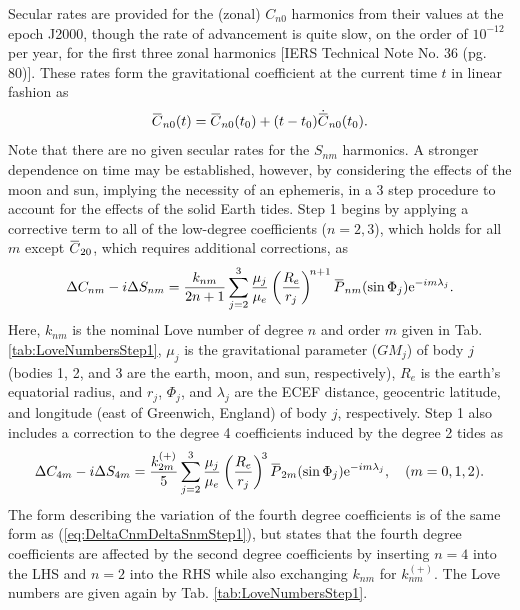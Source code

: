 \documentclass[11pt,dvipsnames]{thesis}
\newcommand{\overbar}[1]{\mkern 1.5mu\overline{\mkern-1.5mu#1\mkern-1.5mu}\mkern 1.5mu}
\begin{document}
Secular rates are provided for the (zonal) $C_{n0}$ harmonics from their values at the epoch J2000, though the rate of advancement is quite slow, on the order of $10^{-12}$ per year, for the first three zonal harmonics [IERS Technical Note No. 36 (pg. 80)]. These rates form the gravitational coefficient at the current time $t$ in linear fashion as
\begin{equation}
\overbar{C}_{n0}(t) = \overbar{C}_{n0}(t_0) + (t - t_0) \dot{\overbar{C}}_{n0}(t_0).
\end{equation}
Note that there are no given secular rates for the $S_{nm}$ harmonics. A stronger dependence on time may be established, however, by considering the effects of the moon and sun, implying the necessity of an ephemeris, in a 3 step procedure to account for the effects of the solid Earth tides. Step 1 begins by applying a corrective term to all of the low-degree coefficients ($n=2,3$), which holds for all $m$ except $\overbar{C}_{20}$, which requires additional corrections, as
\begin{equation}
\Delta C_{nm} - i \Delta S_{nm} = \frac{k_{nm}}{2n + 1} \sum_{j = 2}^3 \frac{\mu_j}{\mu_e} \left(\frac{R_e}{r_j}\right)^{\!n+1} \overbar{P}_{nm}(\sin\Phi_j) \mathrm{e}^{-i m \lambda_j}. \label{eq:DeltaCnmDeltaSnmStep1}
\end{equation}
Here, $k_{nm}$ is the nominal Love number of degree $n$ and order $m$ given in Tab. \ref{tab:LoveNumbersStep1}, $\mu_j$ is the gravitational parameter ($GM_j$) of body $j$ (bodies 1, 2, and 3 are the earth, moon, and sun, respectively), $R_e$ is the earth's equatorial radius, and $r_j$, $\Phi_j$, and $\lambda_j$ are the ECEF distance, geocentric latitude, and longitude (east of Greenwich, England) of body $j$, respectively. 
Step 1 also includes a correction to the degree 4 coefficients induced by the degree 2 tides as
\begin{equation}
\Delta C_{4m} - i\Delta S_{4m} = \frac{k_{2m}^{(+)}}{5} \sum_{j = 2}^3 \frac{\mu_j}{\mu_e} \left(\frac{R_e}{r_j}\right)^{\!3} \overbar{P}_{2m}(\sin\Phi_j) \mathrm{e}^{-im\lambda_j}, \quad (m = 0,1,2). \label{eq:DeltaC4mDeltaS4mStep1}
\end{equation}
The form describing the variation of the fourth degree coefficients is of the same form as (\ref{eq:DeltaCnmDeltaSnmStep1}), but states that the fourth degree coefficients are affected by the second degree coefficients by inserting $n = 4$ into the LHS and $n=2$ into the RHS while also exchanging $k_{nm}$ for $k_{nm}^{(+)}$.
The Love numbers are given again by Tab. \ref{tab:LoveNumbersStep1}.
\end{document}

